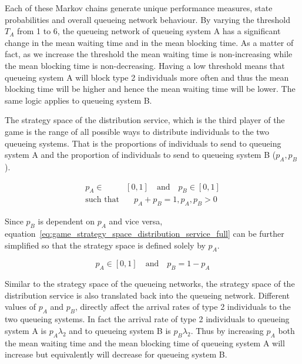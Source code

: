 Each of these Markov chains generate unique performance measures, state
probabilities and overall queueing network behaviour.
By varying the threshold \(T_A\) from 1 to 6, the queueing network of queueing
system A has a significant change in the mean waiting time and in the mean
blocking time.
As a matter of fact, as we increase the threshold the mean waiting time is
non-increasing while the mean blocking time is non-decreasing.
Having a low threshold means that queueing system A will block type 2
individuals more often and thus the mean blocking time will be higher and
hence the mean waiting time will be lower.
The same logic applies to queueing system B.

The strategy space of the distribution service, which is the third player of the
game is the range of all possible ways to distribute individuals to the two
queueing systems.
That is the proportions of individuals to send to queueing system A and the
proportion of individuals to send to queueing system B (\(p_A, p_B\)).

\begin{align}
    p_A \in & [0, 1] \quad \text{and} \quad p_B \in [0, 1] \nonumber \\
    \text{such that} & \quad p_A + p_B = 1, p_A, p_B > 0
    \label{eq:game_strategy_space_distribution_service_full}
\end{align}

Since \(p_B\) is dependent on \(p_A\) and vice versa,
equation~\ref{eq:game_strategy_space_distribution_service_full} can be further
simplified so that the strategy space is defined solely by \(p_A\).

\begin{equation}\label{eq:game_strategy_space_distribution_service_simplified}
    p_A \in [0, 1] \quad \text{and} \quad p_B = 1 - p_A
\end{equation}

Similar to the strategy space of the queueing networks, the strategy space of
the distribution service is also translated back into the queueing network.
Different values of \(p_A\) and \(p_B\), directly affect the arrival rates of
type 2 individuals to the two queueing systems.
In fact the arrival rate of type 2 individuals to queueing system A is
\(p_A \lambda_2\) and to queueing system B is \(p_B \lambda_2\).
Thus by increasing \(p_A\) both the mean waiting time and the mean blocking time
of queueing system A will increase but equivalently will decrease for queueing
system B.


